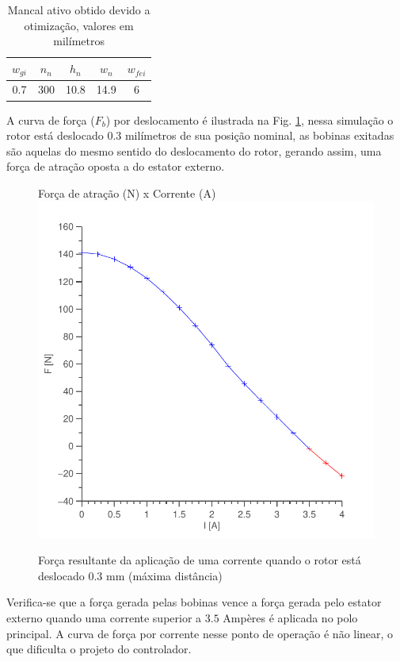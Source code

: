 \begin{table}[ht!]
	\centering
	\begin{tabular}{c c c c c}
		 $w_{gi}$ 	& $n_n$ & $h_n$ & $w_n$ & $w_{fei}$  \\ \hline \hline
		 0.7		& 300  	& 10.8 	& 14.9	& 6
	\end{tabular} 
	\caption{Mancal ativo obtido devido a otimização, valores em milímetros}
	\label{tab:ativo:resultado} 
\end{table}

A curva de força ($F_b$) por deslocamento é ilustrada na Fig. \ref{ativo_otimizado_fem_I_dx03}, nessa simulação o rotor está deslocado 0.3 milímetros de sua posição nominal, as bobinas exitadas são aquelas do mesmo sentido do deslocamento do rotor, gerando assim, uma força de atração oposta a do estator externo.  

\begin{figure}[ht!]
\centering
Força de atração (N) x Corrente (A)
\includegraphics[width=0.8\linewidth]{Figs/Simulacoes/Ativo/ativo_otimizado_fem_I_dx03}
\caption{Força resultante da aplicação de uma corrente quando o rotor está deslocado 0.3 mm (máxima distância)}
\label{ativo_otimizado_fem_I_dx03}
\end{figure}

Verifica-se que a força gerada pelas bobinas vence a força gerada pelo estator externo quando uma corrente superior a $3.5$ Ampères é aplicada no polo principal. A curva de força por corrente nesse ponto de operação é não linear, o que dificulta o projeto do controlador.

